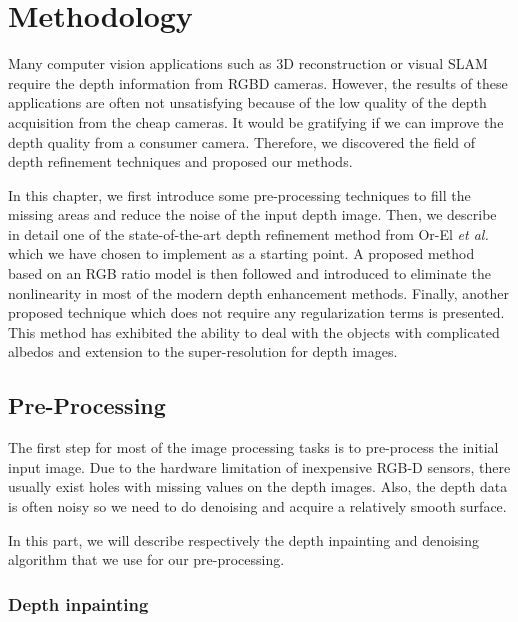 \chapter{Methodology} \label{chap:methodology}
Many computer vision applications such as 3D reconstruction or visual SLAM require the depth information from RGBD cameras. 
However, the results of these applications are often not unsatisfying because of the low quality of the depth acquisition from the cheap cameras. 
It would be gratifying if we can improve the depth quality from a consumer camera.
Therefore, we discovered the field of depth refinement techniques and proposed our methods.

In this chapter, we first introduce some pre-processing techniques to fill the missing areas and reduce the noise of the input depth image. 
Then, we describe in detail one of the state-of-the-art depth refinement method from Or-El \emph{et al.}~\cite{or2015rgbd} which we have chosen to implement as a starting point.
A proposed method based on an RGB ratio model is then followed and introduced to eliminate the nonlinearity in most of the modern depth enhancement methods.
Finally, another proposed technique which does not require any regularization terms is presented. 
This method has exhibited the ability to deal with the objects with complicated albedos and extension to the super-resolution for depth images.
 

\section{Pre-Processing}
The first step for most of the image processing tasks is to pre-process the initial input image. 
Due to the hardware limitation of inexpensive RGB-D sensors, there usually exist holes with missing values on the depth images. 
Also, the depth data is often noisy so we need to do denoising and acquire a relatively smooth surface.

In this part, we will describe respectively the depth inpainting and denoising algorithm that we use for our pre-processing. 
\subsection{Depth inpainting}


